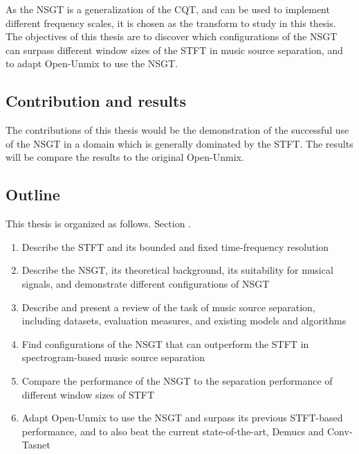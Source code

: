 \documentclass[report.tex]{subfiles}
\begin{document}
As the NSGT is a generalization of the CQT, and can be used to implement different frequency scales, it is chosen as the transform to study in this thesis. The objectives of this thesis are to discover which configurations of the NSGT can surpass different window sizes of the STFT in music source separation, and to adapt Open-Unmix to use the NSGT.

\subsection{Contribution and results}

The contributions of this thesis would be the demonstration of the successful use of the NSGT in a domain which is generally dominated by the STFT.  The results will be compare the results to the original Open-Unmix.

\subsection{Outline}

This thesis is organized as follows. Section .

\begin{enumerate}
	\item
		Describe the STFT and its bounded and fixed time-frequency resolution
	\item
		Describe the NSGT, its theoretical background, its suitability for musical signals, and demonstrate different configurations of NSGT
	\item
		Describe and present a review of the task of music source separation, including datasets, evaluation measures, and existing models and algorithms
	\item
		Find configurations of the NSGT that can outperform the STFT in spectrogram-based music source separation
	\item
		Compare the performance of the NSGT to the separation performance of different window sizes of STFT
	\item
		Adapt Open-Unmix to use the NSGT and surpass its previous STFT-based performance, and to also beat the current state-of-the-art, Demucs and Conv-Tasnet \cite{demucs}
\end{enumerate}
\end{document}
